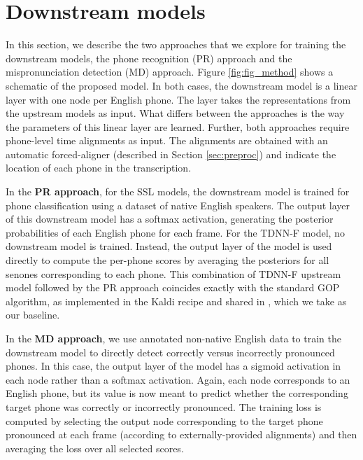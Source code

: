 \documentclass{INTERSPEECH2023}
\begin{document}
\section{Downstream models}
\label{sec:downstream}
In this section, we describe the two approaches that we explore for training the downstream models, the phone recognition (PR) approach and the mispronunciation detection (MD) approach. Figure \ref{fig:fig_method} shows a schematic of the proposed model. In both cases, the downstream model is a linear layer with one node per English phone. The layer takes the representations from the upstream models as input. What differs between the approaches is the way the parameters of this linear layer are learned. Further, both approaches require phone-level time alignments as input. The alignments are obtained with an automatic forced-aligner (described in Section \ref{sec:preproc}) and indicate the location of each phone in the transcription. 

In the {\bf PR approach}, for the SSL models, the downstream model is trained for phone classification using a dataset of native English speakers. The output layer of this downstream model has a softmax activation, generating the posterior probabilities of each English phone for each frame. For the TDNN-F model, no downstream model is trained. Instead, the output layer of the model is used directly to compute the per-phone scores by averaging the posteriors for all senones corresponding to each phone. This combination of TDNN-F upstream model followed by the PR approach coincides exactly with the standard GOP algorithm, as implemented in the Kaldi recipe and shared in \cite{sancinetti2022transfer}, which we take as our baseline. 

In the {\bf MD approach}, we use annotated non-native English data to train the downstream model to directly detect correctly versus incorrectly pronounced phones. In this case, the output layer of the model has a sigmoid activation in each node rather than a softmax activation. Again, each node corresponds to an English phone, but its value is now meant to predict whether the corresponding target phone was correctly or incorrectly pronounced. The training loss is computed by selecting the output node corresponding to the target phone pronounced at each frame (according to externally-provided alignments) and then averaging the loss over all selected scores. 
\end{document}
